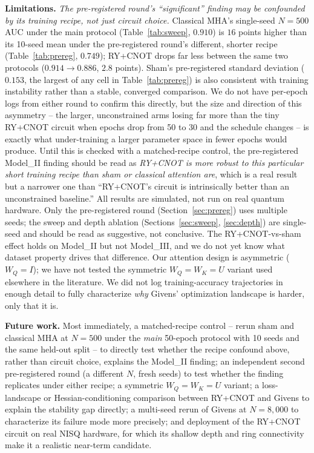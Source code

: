\documentclass[10pt,letterpaper]{article}
\theoremstyle{plain}
\theoremstyle{definition}
\begin{document}
\textbf{Limitations.} \emph{The pre-registered round's ``significant''
finding may be confounded by its training recipe, not just circuit
choice.} Classical MHA's single-seed $N{=}500$ AUC under the main
protocol (Table~\ref{tab:sweep}, $0.910$) is $16$ points higher than its
10-seed mean under the pre-registered round's different, shorter recipe
(Table~\ref{tab:prereg}, $0.749$); RY+CNOT drops far less between the same
two protocols ($0.914 \to 0.886$, $2.8$ points). Sham's pre-registered
standard deviation ($0.153$, the largest of any cell in
Table~\ref{tab:prereg}) is also consistent with training instability
rather than a stable, converged comparison. We do not have per-epoch logs
from either round to confirm this directly, but the size and direction of
this asymmetry -- the larger, unconstrained arms losing far more than the
tiny RY+CNOT circuit when epochs drop from 50 to 30 and the schedule
changes -- is exactly what under-training a larger parameter space in
fewer epochs would produce. Until this is checked with a matched-recipe
control, the pre-registered Model\_II finding should be read as
\emph{RY+CNOT is more robust to this particular short training recipe than
sham or classical attention are}, which is a real result but a narrower
one than ``RY+CNOT's circuit is intrinsically better than an unconstrained
baseline.'' All results are simulated, not run on real quantum
hardware. Only the pre-registered round (Section~\ref{sec:prereg}) uses
multiple seeds; the sweep and depth ablation (Sections~\ref{sec:sweep},
\ref{sec:depth}) are single-seed and should be read as suggestive, not
conclusive. The RY+CNOT-vs-sham effect holds on Model\_II but not
Model\_III, and we do not yet know what dataset property drives that
difference. Our attention design is asymmetric ($W_Q{=}I$); we have not
tested the symmetric $W_Q{=}W_K{=}U$ variant used elsewhere in the
literature. We did not log training-accuracy trajectories in enough detail
to fully characterize \emph{why} Givens' optimization landscape is harder,
only that it is.

\textbf{Future work.} Most immediately, a matched-recipe control -- rerun
sham and classical MHA at $N{=}500$ under the \emph{main} 50-epoch
protocol with 10 seeds and the same held-out split -- to directly test
whether the recipe confound above, rather than circuit choice, explains
the Model\_II finding; an independent second pre-registered round (a
different $N$, fresh seeds) to test whether the finding replicates under
either recipe; a symmetric $W_Q{=}W_K{=}U$ variant; a loss-landscape or
Hessian-conditioning comparison between RY+CNOT and Givens to explain the
stability gap directly; a multi-seed rerun of Givens at $N{=}8{,}000$ to
characterize its failure mode more precisely; and deployment of the
RY+CNOT circuit on real NISQ hardware, for which its shallow depth and
ring connectivity make it a realistic near-term candidate.
\end{document}
